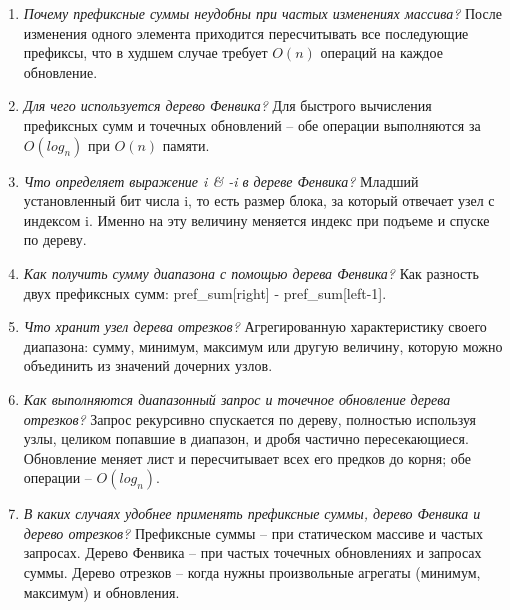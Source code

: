 \begin{enumerate}
	\item \textit{Почему префиксные суммы неудобны при частых изменениях массива?}\newline
	После изменения одного элемента приходится пересчитывать все последующие префиксы, 
	что в худшем случае требует $O(n)$ операций на каждое обновление.
	
	\item \textit{Для чего используется дерево Фенвика?}\newline
	Для быстрого вычисления префиксных сумм и точечных обновлений -- обе операции выполняются за $O(log_n)$ при $O(n)$ памяти.
	
	\item \textit{Что определяет выражение i \& -i в дереве Фенвика?}\newline
	Младший установленный бит числа i, то есть размер блока, за который отвечает узел с индексом i. 
	Именно на эту величину меняется индекс при подъеме и спуске по дереву.
	
	\item \textit{Как получить сумму диапазона с помощью дерева Фенвика?}\newline
	Как разность двух префиксных сумм: pref\_sum[right] - pref\_sum[left-1].
	
	\item \textit{Что хранит узел дерева отрезков?}\newline
	Агрегированную характеристику своего диапазона: сумму, минимум, максимум или другую величину, которую можно объединить из значений дочерних узлов.
	
	\item \textit{Как выполняются диапазонный запрос и точечное обновление дерева отрезков?}\newline
	Запрос рекурсивно спускается по дереву, полностью используя узлы, целиком попавшие в диапазон, и дробя частично пересекающиеся. 
	Обновление меняет лист и пересчитывает всех его предков до корня; обе операции -- $O(log_n)$.
	
	\item \textit{В каких случаях удобнее применять префиксные суммы, дерево Фенвика и дерево отрезков?}\newline
	Префиксные суммы -- при статическом массиве и частых запросах. 
	Дерево Фенвика -- при частых точечных обновлениях и запросах суммы. 
	Дерево отрезков -- когда нужны произвольные агрегаты (минимум, максимум) и обновления.
\end{enumerate}

